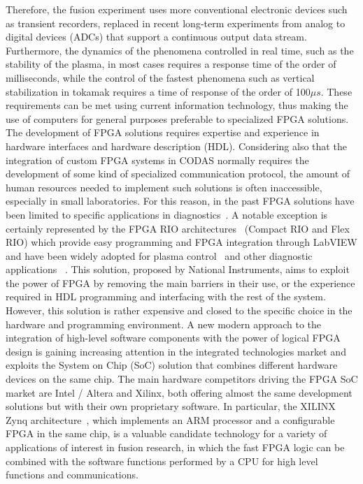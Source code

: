 Therefore, the fusion experiment uses more conventional electronic devices such as transient recorders, replaced in recent long-term experiments from analog to digital devices (ADCs) that support a continuous output data stream. Furthermore, the dynamics of the phenomena controlled in real time, such as the stability of the plasma, in most cases requires a response time of the order of milliseconds, while the control of the fastest phenomena such as vertical stabilization in tokamak requires a time of response of the order of 100$\mu s$. These requirements can be met using current information technology, thus making the use of computers for general purposes preferable to specialized FPGA solutions. The development of FPGA solutions requires expertise and experience in hardware interfaces and hardware description (HDL). Considering also that the integration of custom FPGA systems in CODAS normally requires the development of some kind of specialized communication protocol, the amount of human resources needed to implement such solutions is often inaccessible, especially in small laboratories. For this reason, in the past FPGA solutions have been limited to specific applications in diagnostics~\cite{ana_1,ana_2}. A notable exception is certainly represented by the FPGA RIO architectures~\cite{ana_3} (Compact RIO and Flex RIO) which provide easy programming and FPGA integration through LabVIEW and have been widely adopted for plasma control~\cite{ana_4} and other diagnostic applications~\cite{ana_5} . This solution, proposed by National Instruments, aims to exploit the power of FPGA by removing the main barriers in their use, or the experience required in HDL programming and interfacing with the rest of the system. However, this solution is rather expensive and closed to the specific choice in the hardware and programming environment. A new modern approach to the integration of high-level software components with the power of logical FPGA design is gaining increasing attention in the integrated technologies market and exploits the System on Chip (SoC) solution that combines different hardware devices on the same chip. The main hardware competitors driving the FPGA SoC market are Intel / Altera and Xilinx, both offering almost the same development solutions but with their own proprietary software. In particular, the XILINX Zynq architecture~\cite{ana_6}, which implements an ARM processor and a configurable FPGA in the same chip, is a valuable candidate technology for a variety of applications of interest in fusion research, in which the fast FPGA logic can be combined with the software functions performed by a CPU for high level functions and communications.

